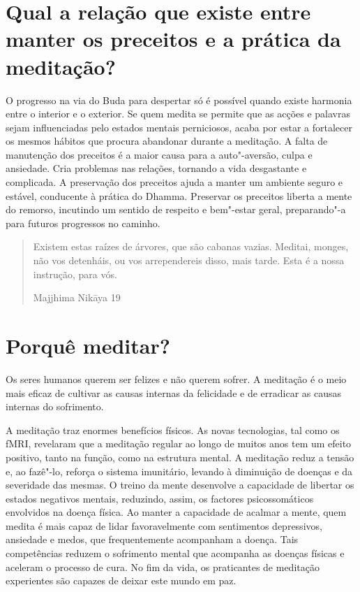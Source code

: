 \section{Qual a relação que existe entre manter os preceitos e a prática da
  meditação?}

O progresso na via do Buda para despertar só é possível quando existe
harmonia entre o interior e o exterior. Se quem medita se permite que
as acções e palavras sejam influenciadas pelo estados mentais
perniciosos, acaba por estar a fortalecer os mesmos hábitos que procura
abandonar durante a meditação. A falta de manutenção dos preceitos é a
maior causa para a auto"-aversão, culpa e ansiedade. Cria problemas nas
relações, tornando a vida desgastante e complicada. A preservação dos
preceitos ajuda a manter um ambiente seguro e estável, conducente à
prática do Dhamma. Preservar os preceitos liberta a mente do remorso,
incutindo um sentido de respeito e bem"-estar geral, preparando"-a para
futuros progressos no caminho.

\clearpage\thispagestyle{empty}\mbox{}%

\clearpage
{}

\begin{verse}
  Existem estas raízes de árvores, que são cabanas vazias. Meditai, monges, não
  vos detenháis, ou vos arrependereis disso, mais tarde. Esta é a nossa
  instrução, para vós.

  Majjhima Nikāya 19
\end{verse}

\section{Porquê meditar?}

Os seres humanos querem ser felizes e não querem sofrer. A meditação é o
meio mais eficaz de cultivar as causas internas da felicidade e de
erradicar as causas internas do sofrimento.

A meditação traz enormes benefícios físicos. As novas tecnologias, tal
como os fMRI, revelaram que a meditação regular ao longo de muitos anos
tem um efeito positivo, tanto na função, como na estrutura mental. A
meditação reduz a tensão e, ao fazê"-lo, reforça o sistema imunitário,
levando à diminuição de doenças e da severidade das mesmas. O treino da
mente desenvolve a capacidade de libertar os estados negativos mentais,
reduzindo, assim, os factores psicossomáticos envolvidos na doença
física. Ao manter a capacidade de acalmar a mente, quem medita é mais
capaz de lidar favoravelmente com sentimentos depressivos, ansiedade e
medos, que frequentemente acompanham a doença. Tais competências reduzem
o sofrimento mental que acompanha as doenças físicas e aceleram o
processo de cura. No fim da vida, os praticantes de meditação
experientes são capazes de deixar este mundo em paz.

